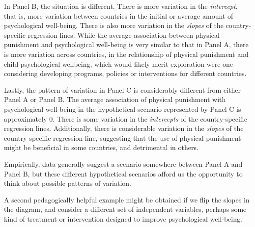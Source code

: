 \documentclass[
  letterpaper,
  DIV=11,
  numbers=noendperiod]{scrreprt}
\begin{document}
In Panel B, the situation is different. There is more variation in the
\emph{intercept}, that is, more variation between countries in the
initial or average amount of psychological well-being. There is also
more variation in the \emph{slopes} of the country-specific regression
lines. While the average association between physical punishment and
psychological well-being is very similar to that in Panel A, there is
more variation across countries, in the relationship of physical
punishment and child psychological wellbeing, which would likely merit
exploration were one considering developing programs, policies or
interventions for different countries.

Lastly, the pattern of variation in Panel C is considerably different
from either Panel A or Panel B. The average association of physical
punishment with psychological well-being in the hypothetical scenario
represented by Panel C is approximately 0. There is some variation in
the \emph{intercepts} of the country-specific regression lines.
Additionally, there is considerable variation in the \emph{slopes} of
the country-specific regression line, suggesting that the use of
physical punishment might be beneficial in some countries, and
detrimental in others.

Empirically, data generally suggest a scenario somewhere between Panel A
and Panel B, but these different hypothetical scenarios afford us the
opportunity to think about possible patterns of variation.

A second pedagogically helpful example might be obtained if we flip the
slopes in the diagram, and consider a different set of independent
variables, perhaps some kind of treatment or intervention designed to
improve psychological well-being.
\end{document}
